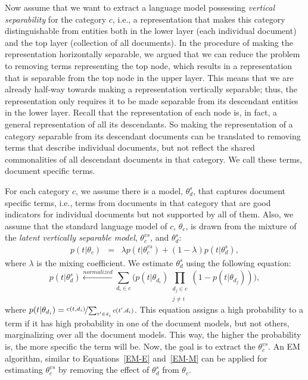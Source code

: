 Now assume that we want to extract a language model possessing \emph{vertical separability} for the category $c$, i.e., a representation that makes this category distinguishable from entities both in the lower layer (each individual document) and the top layer (collection of all documents).
%
In the procedure of making the representation horizontally separable, we argued that we can reduce the problem to removing terms representing the top node, which results in a representation that is separable from the top node in the upper layer. This means that we are already half-way towards making a representation vertically separable; thus, the representation only requires it to be made separable from its descendant entities in the lower layer.  
Recall that the representation of each node is, in fact, a general representation of all its descendants. So making the representation of a category separable from its descendant documents can be translated to removing terms that describe individual documents, but not reflect the shared commonalities of all descendant documents in that category. We call these terms, document specific terms.

For each category $c$, we assume there is a  model, $\theta_d^{s}$, that captures document specific terms, i.e., terms from documents in that category that are good indicators for individual documents but not supported by all of them. Also, we assume that the standard language model of $c$, $\theta_{c}$, is drawn from the mixture of the \emph{latent vertically separable model}, $\theta_{c}^{vs}$, and $\theta_d^{s}$: 
\begin{eqnarray}
p(t|\theta_{c}) & = & \lambda p(t|\theta_{c}^{vs}) + (1-\lambda) p(t|\theta_d^s),
\end{eqnarray}
where $\lambda$ is the mixing coefficient. 
We estimate $\theta_d^s$ using the following equation:
\begin{equation}
p(t|\theta_d^s)  \xleftarrow{normalized} 
\sum_{d_i\in c} 
\bigg(
p(t|\theta_{d_i}) \prod_{\substack{d_j\in c \\ j \neq i}} (1-p(t|\theta_{d_j}))
\bigg),
\label{eq:smodel}
\end{equation}
where $p(t|\theta_{d_i}) = \nicefrac{c(t,d_i)}{\sum_{t' \in d_i} c(t',d_i)}$. This equation assigns a high probability to a term if it has high probability in one of the document models, but not others, marginalizing over all the document models.  This way, the higher the probability is, the more specific the term will be. 
Now, the goal is to extract the $\theta_{c}^{vs}$. An EM algorithm, similar to Equations~\ref{EM-E} and~\ref{EM-M} can be applied for estimating $\theta_{c}^{vs}$ by removing the effect of $\theta_d^s$ from $\theta_{c}$.

